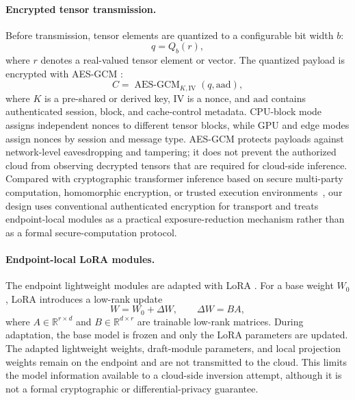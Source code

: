 \documentclass{article}
\newcommand{\AESGCM}{\operatorname{AES\text{-}GCM}}
\begin{document}
\paragraph{Encrypted tensor transmission.}
Before transmission, tensor elements are quantized to a configurable bit width $b$:
\begin{equation}
  q=Q_b(r),
\end{equation}
where $r$ denotes a real-valued tensor element or vector. The quantized payload is encrypted with AES-GCM \cite{nistgcm}:
\begin{equation}
  C=\AESGCM_{K,\mathrm{IV}}(q,\mathrm{aad}),
\end{equation}
where $K$ is a pre-shared or derived key, $\mathrm{IV}$ is a nonce, and $\mathrm{aad}$ contains authenticated session, block, and cache-control metadata. CPU-block mode assigns independent nonces to different tensor blocks, while GPU and edge modes assign nonces by session and message type. AES-GCM protects payloads against network-level eavesdropping and tampering; it does not prevent the authorized cloud from observing decrypted tensors that are required for cloud-side inference. Compared with cryptographic transformer inference based on secure multi-party computation, homomorphic encryption, or trusted execution environments~\cite{pang2024bolt,chen2022thex,li2022mpcformer,nayan2025secureinfer}, our design uses conventional authenticated encryption for transport and treats endpoint-local modules as a practical exposure-reduction mechanism rather than as a formal secure-computation protocol.

\paragraph{Endpoint-local LoRA modules.}
The endpoint lightweight modules are adapted with LoRA \cite{hu2022lora}. For a base weight $W_0$, LoRA introduces a low-rank update
\begin{equation}
  W=W_0+\Delta W, \qquad \Delta W=BA,
\end{equation}
where $A\in\mathbb{R}^{r\times d}$ and $B\in\mathbb{R}^{d\times r}$ are trainable low-rank matrices. During adaptation, the base model is frozen and only the LoRA parameters are updated. The adapted lightweight weights, draft-module parameters, and local projection weights remain on the endpoint and are not transmitted to the cloud. This limits the model information available to a cloud-side inversion attempt, although it is not a formal cryptographic or differential-privacy guarantee.
\end{document}
